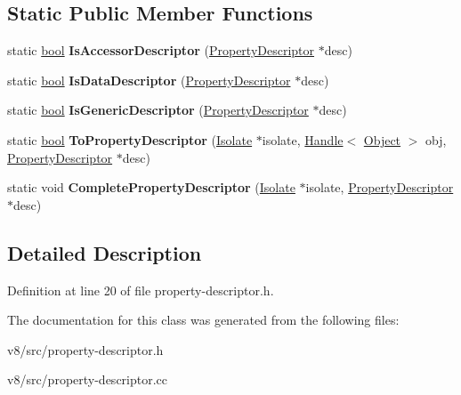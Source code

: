 \subsection*{Static Public Member Functions}
\begin{DoxyCompactItemize}
\item 
\mbox{\label{classv8_1_1internal_1_1PropertyDescriptor_a4ddd81c576fa1059e0250531c3757cb2}} 
static \mbox{\hyperlink{classbool}{bool}} {\bfseries Is\+Accessor\+Descriptor} (\mbox{\hyperlink{classv8_1_1internal_1_1PropertyDescriptor}{Property\+Descriptor}} $\ast$desc)
\item 
\mbox{\label{classv8_1_1internal_1_1PropertyDescriptor_abc27e04bfdb68402ee0d08540d7829ea}} 
static \mbox{\hyperlink{classbool}{bool}} {\bfseries Is\+Data\+Descriptor} (\mbox{\hyperlink{classv8_1_1internal_1_1PropertyDescriptor}{Property\+Descriptor}} $\ast$desc)
\item 
\mbox{\label{classv8_1_1internal_1_1PropertyDescriptor_a8d62371003664fcb9147a158ec1bd6e5}} 
static \mbox{\hyperlink{classbool}{bool}} {\bfseries Is\+Generic\+Descriptor} (\mbox{\hyperlink{classv8_1_1internal_1_1PropertyDescriptor}{Property\+Descriptor}} $\ast$desc)
\item 
\mbox{\label{classv8_1_1internal_1_1PropertyDescriptor_aeed9975d1f7309a3c84a6d5f1e9fb722}} 
static \mbox{\hyperlink{classbool}{bool}} {\bfseries To\+Property\+Descriptor} (\mbox{\hyperlink{classv8_1_1internal_1_1Isolate}{Isolate}} $\ast$isolate, \mbox{\hyperlink{classv8_1_1internal_1_1Handle}{Handle}}$<$ \mbox{\hyperlink{classv8_1_1internal_1_1Object}{Object}} $>$ obj, \mbox{\hyperlink{classv8_1_1internal_1_1PropertyDescriptor}{Property\+Descriptor}} $\ast$desc)
\item 
\mbox{\label{classv8_1_1internal_1_1PropertyDescriptor_a8db7289399f6c1605a93e68359d1facd}} 
static void {\bfseries Complete\+Property\+Descriptor} (\mbox{\hyperlink{classv8_1_1internal_1_1Isolate}{Isolate}} $\ast$isolate, \mbox{\hyperlink{classv8_1_1internal_1_1PropertyDescriptor}{Property\+Descriptor}} $\ast$desc)
\end{DoxyCompactItemize}


\subsection{Detailed Description}


Definition at line 20 of file property-\/descriptor.\+h.



The documentation for this class was generated from the following files\+:\begin{DoxyCompactItemize}
\item 
v8/src/property-\/descriptor.\+h\item 
v8/src/property-\/descriptor.\+cc\end{DoxyCompactItemize}
